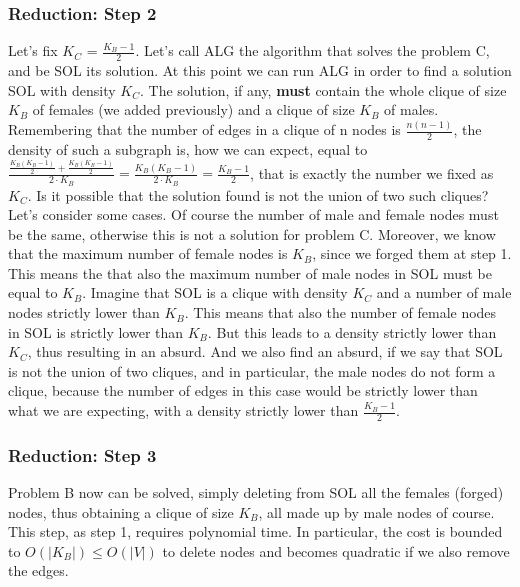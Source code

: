 \subsubsection{Reduction: Step 2}
Let's fix $K_C$ = $\frac{K_B-1}{2}$. Let's call ALG the algorithm that solves the problem C, and be SOL its solution.
At this point we can run ALG in order to find a solution SOL with density $K_C$. The solution, if any, \textbf{must} contain the whole clique of size $K_B$ of females (we added previously) and a clique of size $K_B$ of males. Remembering that the number of edges in a clique of n nodes is $\frac{n(n-1)}{2}$, the density of such a subgraph is, how we can expect, equal to $\frac{\frac{K_B(K_B - 1)}{2} + \frac{K_B(K_B - 1)}{2}}{2 \cdot K_B}  = \frac{K_B(K_B - 1)}{2 \cdot K_B} = \frac{K_B - 1}{2}$, that is exactly the number we fixed as $K_C$.
\newline
Is it possible that the solution found is not the union of two such cliques? Let's consider some cases.
Of course the number of male and female nodes must be the same, otherwise this is not a solution for problem C. Moreover, we know that the maximum number of female nodes is $K_B$, since we forged them at step 1. This means the that also the maximum number of male nodes in SOL must be equal to $K_B$.
Imagine that SOL is a clique with density $K_C$ and a number of male nodes strictly lower than $K_B$. This means that also the number of female nodes in SOL is strictly lower than $K_B$. But this leads to a density strictly lower than $K_C$, thus resulting in an absurd. And we also find an absurd, if we say that SOL is not the union of two cliques, and in particular, the male nodes do not form a clique, because the number of edges in this case would be strictly lower than what we are expecting, with a density strictly lower than $\frac{K_B -1}{2}$.
\subsubsection{Reduction: Step 3}
Problem B now can be solved, simply deleting from SOL all the females (forged) nodes, thus obtaining a clique of size $K_B$, all made up by male nodes of course. This step, as step 1, requires polynomial time. In particular, the cost is bounded to $O(|K_B|) \leq O(|V|)$ to delete nodes and becomes quadratic if we also remove the edges.
